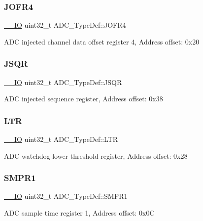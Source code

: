 \subsubsection{\texorpdfstring{JOFR4}{JOFR4}}
{\footnotesize\ttfamily \mbox{\hyperlink{core__sc300_8h_aec43007d9998a0a0e01faede4133d6be}{\+\_\+\+\_\+\+IO}} uint32\+\_\+t A\+D\+C\+\_\+\+Type\+Def\+::\+J\+O\+F\+R4}

A\+DC injected channel data offset register 4, Address offset\+: 0x20 \mbox{\label{struct_a_d_c___type_def_a5438a76a93ac1bd2526e92ef298dc193}} 
\subsubsection{\texorpdfstring{JSQR}{JSQR}}
{\footnotesize\ttfamily \mbox{\hyperlink{core__sc300_8h_aec43007d9998a0a0e01faede4133d6be}{\+\_\+\+\_\+\+IO}} uint32\+\_\+t A\+D\+C\+\_\+\+Type\+Def\+::\+J\+S\+QR}

A\+DC injected sequence register, Address offset\+: 0x38 \mbox{\label{struct_a_d_c___type_def_afdaf8050fb01739206a92c9ad610f396}} 
\subsubsection{\texorpdfstring{LTR}{LTR}}
{\footnotesize\ttfamily \mbox{\hyperlink{core__sc300_8h_aec43007d9998a0a0e01faede4133d6be}{\+\_\+\+\_\+\+IO}} uint32\+\_\+t A\+D\+C\+\_\+\+Type\+Def\+::\+L\+TR}

A\+DC watchdog lower threshold register, Address offset\+: 0x28 \mbox{\label{struct_a_d_c___type_def_a73009a8122fcc628f467a4e997109347}} 
\subsubsection{\texorpdfstring{SMPR1}{SMPR1}}
{\footnotesize\ttfamily \mbox{\hyperlink{core__sc300_8h_aec43007d9998a0a0e01faede4133d6be}{\+\_\+\+\_\+\+IO}} uint32\+\_\+t A\+D\+C\+\_\+\+Type\+Def\+::\+S\+M\+P\+R1}

A\+DC sample time register 1, Address offset\+: 0x0C \mbox{\label{struct_a_d_c___type_def_a9e68fe36c4c8fbbac294b5496ccf7130}} 
